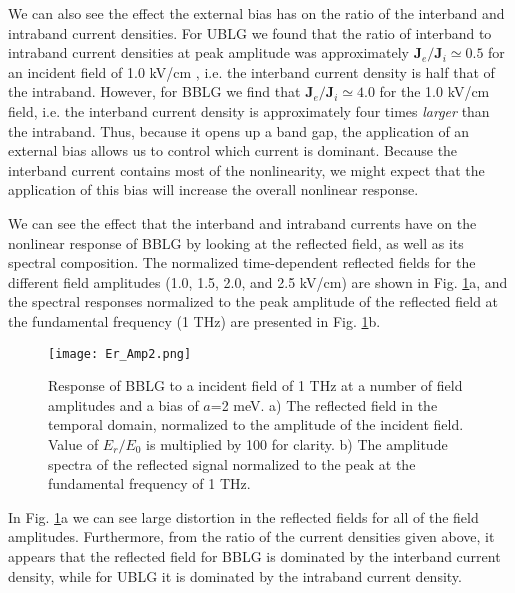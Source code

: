 \documentclass[twocolumn,secnumarabic,amssymb, nobibnotes, aps, prd, superscriptaddress]{revtex4-1}
\begin{document}
We can also see the effect the external bias has on the ratio of the interband and intraband current densities. For UBLG we found that the ratio of interband to intraband current densities at peak amplitude was approximately $\mathbf{J}_{e}/\mathbf{J}_{i}\simeq0.5$ for an incident field of 1.0 kV/cm \cite{mcgouran2016nonlinear}, i.e. the interband current density is half that of the intraband. However, for BBLG we find that $\mathbf{J}_{e}/\mathbf{J}_{i}\simeq4.0$ for the 1.0 kV/cm field, i.e. the interband current density is approximately four times \textit{larger} than the intraband. Thus, because it opens up a band gap, the application of an external bias allows us to control which current is dominant. Because the interband current contains most of the nonlinearity, we might expect that the application of this bias will increase the overall nonlinear response.

We can see the effect that the interband and intraband currents have on the nonlinear response of BBLG by looking at the reflected field, as well as its spectral composition. The normalized time-dependent reflected fields for the different field amplitudes (1.0, 1.5, 2.0, and 2.5 kV/cm) are shown in Fig. \ref{fig:5.7}a, and the spectral responses normalized to the peak amplitude of the reflected field at the fundamental frequency (1 THz) are presented in Fig. \ref{fig:5.7}b. 
\begin{figure}[h]
\centering
\texttt{[image: Er\_Amp2.png]}
\caption{Response of BBLG to a incident field of 1 THz at a number of field amplitudes and a bias of $a$=2 meV. a) The reflected field in the temporal domain, normalized to the amplitude of the incident field. Value of $E_r/E_0$ is multiplied by 100 for clarity. b) The amplitude spectra of the reflected signal normalized to the peak at the fundamental frequency of 1 THz.}\label{fig:5.7}
\end{figure}

In Fig. \ref{fig:5.7}a we can see large distortion in the reflected fields for all of the field amplitudes. Furthermore, from the ratio of the current densities given above, it appears that the reflected field for BBLG is dominated by the interband current density, while for UBLG it is dominated by the intraband current density. 
\end{document}
